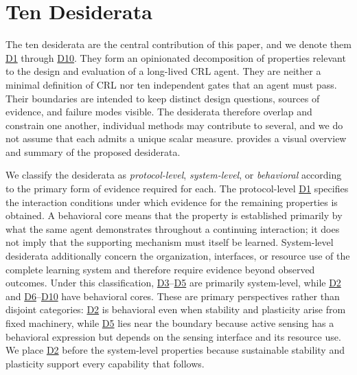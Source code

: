 \documentclass[10pt,journal,compsoc]{IEEEtran}
\DeclareRobustCommand{\Dref}[1]{\hyperref[sec:d#1]{D#1}}
\begin{document}
\section{Ten Desiderata}
\label{sec:10d}

The ten desiderata are the central contribution of this paper, and we denote them \Dref{1} through \Dref{10}.
They form an opinionated decomposition of properties relevant to the design and evaluation of a long-lived CRL agent.
They are neither a minimal definition of CRL nor ten independent gates that an agent must pass.
Their boundaries are intended to keep distinct design questions, sources of evidence, and failure modes visible.
The desiderata therefore overlap and constrain one another, individual methods may contribute to several, and we do not assume that each admits a unique scalar measure.
 provides a visual overview and summary of the proposed desiderata.

We classify the desiderata as \emph{protocol-level}, \emph{system-level}, or \emph{behavioral} according to the primary form of evidence required for each.
The protocol-level \Dref{1} specifies the interaction conditions under which evidence for the remaining properties is obtained.
A behavioral core means that the property is established primarily by what the same agent demonstrates throughout a continuing interaction; it does not imply that the supporting mechanism must itself be learned.
System-level desiderata additionally concern the organization, interfaces, or resource use of the complete learning system and therefore require evidence beyond observed outcomes.
Under this classification, \Dref{3}--\Dref{5} are primarily system-level, while \Dref{2} and \Dref{6}--\Dref{10} have behavioral cores.
These are primary perspectives rather than disjoint categories: \Dref{2} is behavioral even when stability and plasticity arise from fixed machinery, while \Dref{5} lies near the boundary because active sensing has a behavioral expression but depends on the sensing interface and its resource use.
We place \Dref{2} before the system-level properties because sustainable stability and plasticity support every capability that follows.
\end{document}
